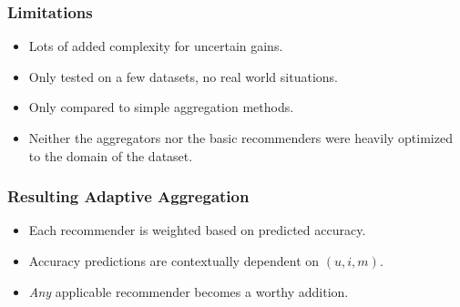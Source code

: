 \documentclass[screen]{beamer}
\begin{document}
\begin{frame}
  \frametitle{Limitations}
  \begin{itemize}
    \item Lots of added complexity for uncertain gains.
    \item Only tested on a few datasets, no real world situations.
    \item Only compared to simple aggregation methods.
    \item Neither the aggregators nor the basic recommenders were
      heavily optimized to the domain of the dataset.
  \end{itemize}
\end{frame}

\begin{frame}
  \frametitle{Resulting Adaptive Aggregation}
  \begin{itemize}
    \item Each recommender is weighted based on predicted accuracy.
    \item Accuracy predictions are contextually dependent on $(u,i,m)$.
    \item \emph{Any} applicable recommender becomes a worthy addition.
  \end{itemize}
\end{frame}
\end{document}
